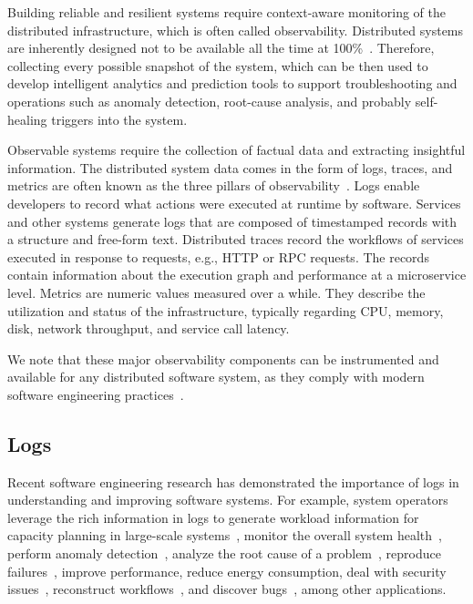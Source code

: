 Building reliable and resilient systems require context-aware monitoring of the distributed infrastructure, which is often called observability. Distributed systems are inherently designed not to be available all the time at 100\%~\cite{gunawi2014bugs}. Therefore, collecting every possible snapshot of the system, which can be then used to develop intelligent analytics and prediction tools to support troubleshooting and operations such as anomaly detection, root-cause analysis, and probably self-healing triggers into the system. 

Observable systems require the collection of factual data and extracting insightful information. The distributed system data comes in the form of logs, traces, and metrics are often known as the three pillars of observability~\cite{nedelkoski2020data,observability2020practical}.
Logs enable developers to record what actions were executed at runtime by software. Services and other systems generate logs that are composed of timestamped records with a structure and free-form text.
Distributed traces record the workflows of services executed in response to requests, e.g., HTTP or RPC requests. The records contain information about the execution graph and performance at a microservice level. Metrics are numeric values measured over a while. They describe the utilization and status of the infrastructure, typically regarding CPU, memory, disk, network throughput, and service call latency. 

We note that these major observability components can be instrumented and available for any distributed software system, as they comply with modern software engineering practices~\cite{sridharan2018distributed}.

\subsection{Logs} 
Recent software engineering research has demonstrated the importance of logs in understanding and improving software systems. For example, system operators leverage the rich information in logs to generate workload information for capacity planning in large-scale systems~\cite{hassan2008industrial,nagappan2009efficiently}, monitor the overall system health~\cite{jiang2013automated}, perform anomaly detection~\cite{meng2019loganomaly,nedelkoski2019anomaly,nedelkoski2020loganomaly,nedelkoski2020selfsupervised,du2017deeplog,zhang2019robust,du2016spell,zhu2019tools}, analyze the root cause of a problem~\cite{Yuan2019AnAT,zhou2019latent,chen2019empirical}, reproduce failures~\cite{zhang2017pensieve}, improve performance, reduce energy consumption, deal with security issues~\cite{zhao2016non}, reconstruct workflows~\cite{bao2019miningworkflows}, and discover bugs~\cite{mohan2018finding}, among other applications. 

